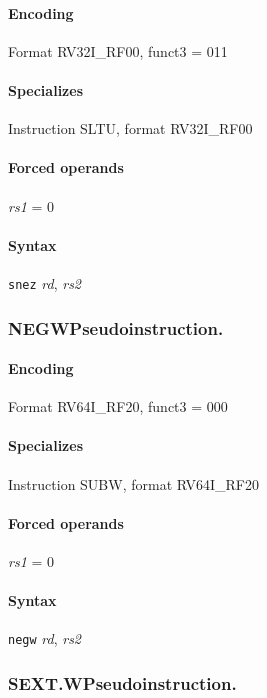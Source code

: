{\paragraph{Encoding} Format \textsf{RV32I\_RF00, funct3 = 011}\\



\paragraph{Specializes} Instruction SLTU, format RV32I\_RF00

\paragraph{Forced operands} \emph{rs1} = 0

\paragraph{Syntax} \texttt{snez} \emph{rd}, \emph{rs2}
\newpage
\subsubsection[{\small NEGW: Pseudoinstruction.}]{NEGW\hfill Pseudoinstruction.}
\label{instr:NEGW}

\paragraph{Encoding} Format \textsf{RV64I\_RF20, funct3 = 000}\\



\paragraph{Specializes} Instruction SUBW, format RV64I\_RF20

\paragraph{Forced operands} \emph{rs1} = 0

\paragraph{Syntax} \texttt{negw} \emph{rd}, \emph{rs2}
\newpage
\subsubsection[{\small SEXT.W: Pseudoinstruction.}]{SEXT.W\hfill Pseudoinstruction.}
\label{instr:SEXT.W}

}
